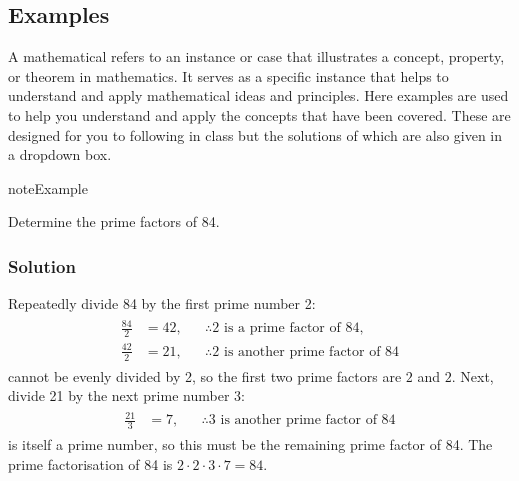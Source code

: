 \documentclass[letterpaper,10pt,english]{jupyterBook}
\begin{document}
\subsection{Examples}
\label{\detokenize{_pages/0.3_Mathematical_preliminaries:examples}}
\sphinxAtStartPar
A mathematical  refers to an instance or case that illustrates a concept, property, or theorem in mathematics. It serves as a specific instance that helps to understand and apply mathematical ideas and principles. Here examples are used to help you understand and apply the concepts that have been covered. These are designed for you to following in class but the solutions of which are also given in a dropdown box.
\label{_pages/0.3_Mathematical_preliminaries:example-2}
\begin{sphinxadmonition}{note}{Example}



\sphinxAtStartPar
Determine the prime factors of 84.
\subsubsection*{Solution}

\sphinxAtStartPar
Repeatedly divide 84 by the first prime number 2:
\begin{equation*}
\begin{split} \begin{align*}
    \frac{84}{2} &= 42, && \therefore \text{2 is a prime factor of 84}, \\
    \frac{42}{2} &= 21, && \therefore \text{2 is another prime factor of 84}
\end{align*} \end{split}
\end{equation*}
 cannot be evenly divided by 2, so the first two prime factors are \(2\) and \(2\). Next, divide 21 by the next prime number 3:
\begin{equation*}
\begin{split} \begin{align*}
    \frac{21}{3} &= 7, && \therefore \text{3 is another prime factor of 84}
\end{align*} \end{split}
\end{equation*}
 is itself a prime number, so this must be the remaining prime factor of 84. The prime factorisation of 84 is \(2 \cdot 2 \cdot 3 \cdot 7 = 84\).
\end{sphinxadmonition}
\end{document}
